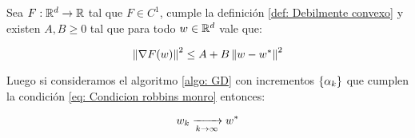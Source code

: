 \begin{theorem}
	\label{theorem: convergencia puntual batch, objetivo debilmente convexo, incrementos decrecientes}
	Sea $F: {\mathbb{R}}^d \rightarrow {\mathbb{R}}$ tal que  $F\in C^1$, cumple la definici\'on \ref{def: Debilmente convexo} y existen $A,B \geq 0$ tal que para todo $w \in {\mathbb{R}}^d$ vale que:
	
	\begin{equation}
	\label{eq: Condicion gradiente acotado, ctp, batch}
		\left\lVert\nabla F(w) \right\rVert^2 \leq A + B \left\lVert w - w^*\right\rVert^2
	\end{equation}
	
	Luego si consideramos el algoritmo \ref{algo: GD} con incrementos $\left\lbrace\alpha_k\right\rbrace$ que cumplen la condici\'on \ref{eq: Condicion robbins monro} entonces:
	
	\begin{equation}
		w_k \xrightarrow[k \rightarrow \infty]{} w^*
	\end{equation}
	
\end{theorem}

